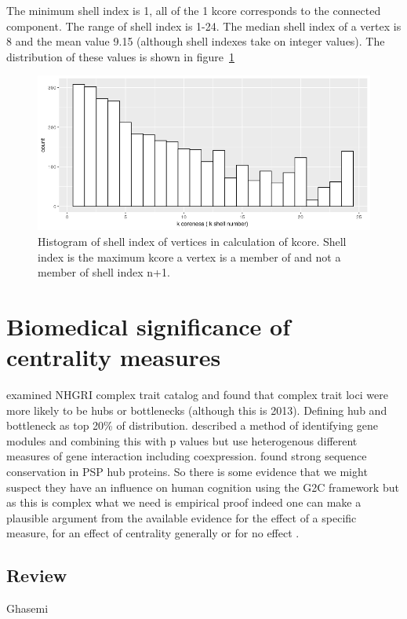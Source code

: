  The minimum shell index is 1, all of the 1 kcore corresponds to the connected component. The range of shell index is 1-24. The median shell index of a vertex is 8 and the mean value 9.15 (although shell indexes take on integer values). The distribution of these values is shown in figure~\ref{fig:Kcore_histogram}
 
 \begin{figure}
     \centering
     \includegraphics[width=\textwidth]{images/Rplot01_kcore_hist.png}
     \caption{Histogram of shell index of vertices in calculation of kcore. Shell index is the maximum kcore a vertex is a member of and not a member of shell index n+1. }
     \label{fig:Kcore_histogram}
 \end{figure}
 

\section{Biomedical significance of centrality measures}
\cite{lee2013network} examined NHGRI complex trait catalog and found that complex trait loci were more likely to be hubs or bottlenecks (although this is 2013). Defining hub and bottleneck as top 20\% of distribution. 
\cite{liu2017sigmod} described a method of identifying gene modules and combining this with p values but use heterogenous different measures of gene interaction including coexpression. 
\cite{bayes2011characterization} found strong sequence conservation in PSP hub proteins. So there is some evidence that we might suspect they have an influence on human cognition using the G2C framework but as this is complex what we need is empirical proof indeed one can make a plausible argument from the available evidence for the effect of a specific measure, for an effect of centrality generally or for no effect .  


\subsection{Review}
Ghasemi
\cite{ghasemi2014centrality}

